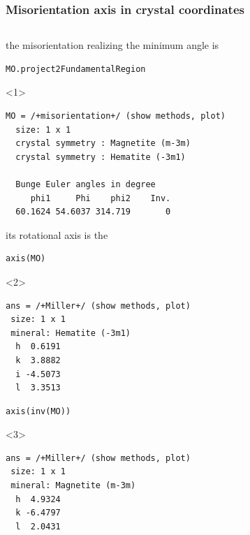 \documentclass[compress]{beamer}
\begin{document}
\begin{frame}[fragile]
  \frametitle{Misorientation axis in crystal coordinates}


\begin{columns}

  \begin{column}{0.67\textwidth}
  \begin{overlayarea}{\textwidth}{\textheight}
    the misorientation realizing the minimum angle is
    \vspace{-0.2cm}
    \begin{lstlisting}[style=input]
MO.project2FundamentalRegion
    \end{lstlisting}
\begin{onlyenv}<1>
  \vspace{-.3cm}
  \begin{lstlisting}[style=output]
MO = /+misorientation+/ (show methods, plot)
  size: 1 x 1
  crystal symmetry : Magnetite (m-3m)
  crystal symmetry : Hematite (-3m1)

  Bunge Euler angles in degree
     phi1     Phi    phi2    Inv.
  60.1624 54.6037 314.719       0
\end{lstlisting}
\end{onlyenv}

\pause

  its rotational axis is the 
  \vspace{-0.2cm}
\begin{lstlisting}[style=input]
axis(MO)
\end{lstlisting}
\vspace{-.3cm}

  \begin{onlyenv}<2>
\begin{lstlisting}[style=output]
ans = /+Miller+/ (show methods, plot)
 size: 1 x 1
 mineral: Hematite (-3m1)
  h  0.6191
  k  3.8882
  i -4.5073
  l  3.3513
\end{lstlisting}
\end{onlyenv}

\pause


\begin{lstlisting}[style=input]
axis(inv(MO))
\end{lstlisting}
\vspace{-.3cm}
    \begin{onlyenv}<3>
\begin{lstlisting}[style=output]
ans = /+Miller+/ (show methods, plot)
 size: 1 x 1
 mineral: Magnetite (m-3m)
  h  4.9324
  k -6.4797
  l  2.0431
\end{lstlisting}
\end{onlyenv}


\end{overlayarea}
\end{column}
\end{columns}
\end{frame}
\end{document}
